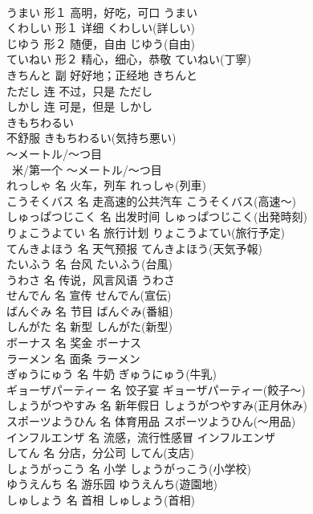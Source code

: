 \documentclass[8pt]{extreport}
\begin{document}
\begin{CJK}{UTF8}{min}
\\	うまい	形１	高明，好吃，可口	うまい	
\\	くわしい	形１	详细	くわしい(詳しい)	
\\	じゆう	形２	随便，自由	じゆう(自由)	
\\	ていねい	形２	精心，细心，恭敬	ていねい(丁寧)	
\\	きちんと	副	好好地；正经地	きちんと	
\\	ただし	连	不过，只是	ただし	
\\	しかし	连	可是，但是	しかし	
\\	きもちわるい	
\\	不舒服	きもちわるい(気持ち悪い)	
\\	～メートル/～つ目	
\\	~米/第一个	～メートル/～つ目	
\\	れっしゃ	名	火车，列车	れっしゃ(列車)	
\\	こうそくバス	名	走高速的公共汽车	こうそくバス(高速～)	
\\	しゅっぱつじこく	名	出发时间	しゅっぱつじこく(出発時刻)	
\\	りょこうよてい	名	旅行计划	りょこうよてい(旅行予定)	
\\	てんきよほう	名	天气预报	てんきよほう(天気予報)	
\\	たいふう	名	台风	たいふう(台風)	
\\	うわさ	名	传说，风言风语	うわさ	
\\	せんでん	名	宣传	せんでん(宣伝)	
\\	ばんぐみ	名	节目	ばんぐみ(番組)	
\\	しんがた	名	新型	しんがた(新型)	
\\	ボーナス	名	奖金	ボーナス	
\\	ラーメン	名	面条	ラーメン	
\\	ぎゅうにゅう	名	牛奶	ぎゅうにゅう(牛乳)	
\\	ギョーザパーティー	名	饺子宴	ギョーザパーティー(餃子～)	
\\	しょうがつやすみ	名	新年假日	しょうがつやすみ(正月休み)	
\\	スポーツようひん	名	体育用品	スポーツようひん(～用品)	
\\	インフルエンザ	名	流感，流行性感冒	インフルエンザ	
\\	してん	名	分店，分公司	してん(支店)	
\\	しょうがっこう	名	小学	しょうがっこう(小学校)	
\\	ゆうえんち	名	游乐园	ゆうえんち(遊園地)	
\\	しゅしょう	名	首相	しゅしょう(首相)	

\end{CJK}
\end{document}
